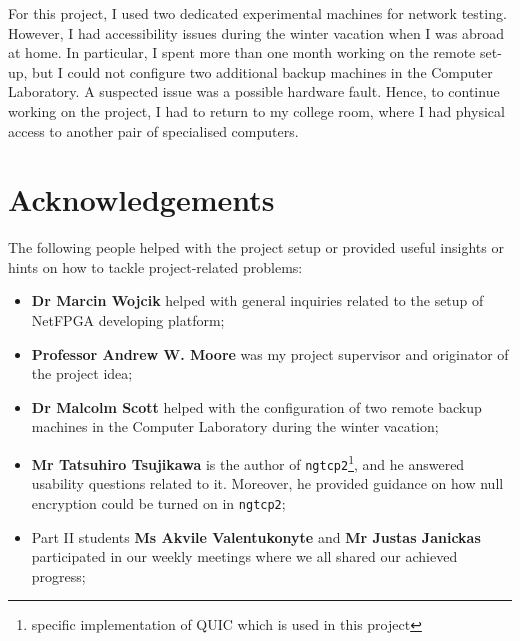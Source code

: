 \documentclass[12pt,a4paper,twoside,openright]{report}
\begin{document}
For this project, I used two dedicated experimental machines for network testing. 
However, I had accessibility issues during the winter vacation when I was abroad at home.
In particular, I spent more than one month working on the remote set-up, but I could not configure two additional backup machines in the Computer Laboratory.
A suspected issue was a possible hardware fault.
Hence, to continue working on the project, I had to return to my college room, where I had physical access to another pair of specialised computers.
 
 
 











\tableofcontents

\listoffigures

\newpage
\section*{Acknowledgements}

The following people helped with the project setup or provided useful insights or hints on how to tackle project-related problems:
\begin{itemize}
    \item \textbf{Dr Marcin Wojcik} helped with general inquiries related to the setup of NetFPGA developing platform;
    \item \textbf{Professor Andrew W. Moore} was my project supervisor and originator of the project idea;
    \item \textbf{Dr Malcolm Scott} helped with the configuration of two remote backup machines in the Computer Laboratory during the winter vacation;
    \item \textbf{Mr Tatsuhiro Tsujikawa} is the author of \texttt{ngtcp2}\footnote{specific implementation of QUIC which is used in this project}, and he answered usability questions related to it. Moreover, he provided guidance on how null encryption could be turned on in \texttt{ngtcp2};
    \item Part II students \textbf{Ms Akvile Valentukonyte} and \textbf{Mr Justas Janickas} participated in our weekly meetings where we all shared our achieved progress;
\end{itemize}
\end{document}
